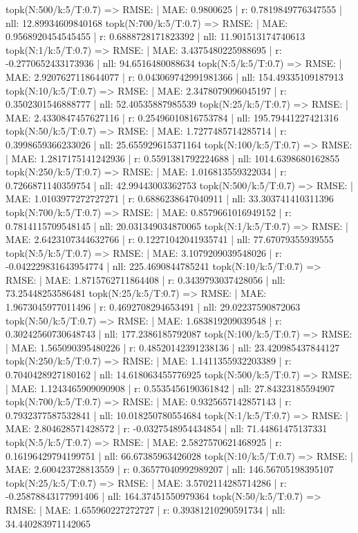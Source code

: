 topk(N:500/k:5/T:0.7) => RMSE: | MAE: 0.9800625 | r: 0.7819849776347555 | nll: 12.89934609840168
topk(N:700/k:5/T:0.7) => RMSE: | MAE: 0.9568920454545455 | r: 0.6888728171823392 | nll: 11.901513174740613
topk(N:1/k:5/T:0.7) => RMSE: | MAE: 3.4375480225988695 | r: -0.2770652433173936 | nll: 94.6516480088634
topk(N:5/k:5/T:0.7) => RMSE: | MAE: 2.9207627118644077 | r: 0.043069742991981366 | nll: 154.49335109187913
topk(N:10/k:5/T:0.7) => RMSE: | MAE: 2.3478079096045197 | r: 0.3502301546888777 | nll: 52.40535887985539
topk(N:25/k:5/T:0.7) => RMSE: | MAE: 2.4330847457627116 | r: 0.25496010816753784 | nll: 195.79441227421316
topk(N:50/k:5/T:0.7) => RMSE: | MAE: 1.7277485714285714 | r: 0.3998659366233026 | nll: 25.655929615371164
topk(N:100/k:5/T:0.7) => RMSE: | MAE: 1.2817175141242936 | r: 0.5591381792224688 | nll: 1014.6398680162855
topk(N:250/k:5/T:0.7) => RMSE: | MAE: 1.016813559322034 | r: 0.7266871140359754 | nll: 42.99443003362753
topk(N:500/k:5/T:0.7) => RMSE: | MAE: 1.0103977272727271 | r: 0.6886238647040911 | nll: 33.303741410311396
topk(N:700/k:5/T:0.7) => RMSE: | MAE: 0.8579661016949152 | r: 0.7814115709548145 | nll: 20.031349034870065
topk(N:1/k:5/T:0.7) => RMSE: | MAE: 2.6423107344632766 | r: 0.12271042041935741 | nll: 77.67079355939555
topk(N:5/k:5/T:0.7) => RMSE: | MAE: 3.1079209039548026 | r: -0.042229831643954774 | nll: 225.4690844785241
topk(N:10/k:5/T:0.7) => RMSE: | MAE: 1.8715762711864408 | r: 0.3439793037428056 | nll: 73.25448253586481
topk(N:25/k:5/T:0.7) => RMSE: | MAE: 1.9673045977011496 | r: 0.4692708294653491 | nll: 29.02237590872063
topk(N:50/k:5/T:0.7) => RMSE: | MAE: 1.683819209039548 | r: 0.30242560730648743 | nll: 177.2386185792087
topk(N:100/k:5/T:0.7) => RMSE: | MAE: 1.565090395480226 | r: 0.48520142391238136 | nll: 23.420985437844127
topk(N:250/k:5/T:0.7) => RMSE: | MAE: 1.1411355932203389 | r: 0.7040428927180162 | nll: 14.618063455776925
topk(N:500/k:5/T:0.7) => RMSE: | MAE: 1.1243465909090908 | r: 0.5535456190361842 | nll: 27.84323185594907
topk(N:700/k:5/T:0.7) => RMSE: | MAE: 0.9325657142857143 | r: 0.7932377587532841 | nll: 10.018250780554684
topk(N:1/k:5/T:0.7) => RMSE: | MAE: 2.804628571428572 | r: -0.0327548954434854 | nll: 71.44861475137331
topk(N:5/k:5/T:0.7) => RMSE: | MAE: 2.5827570621468925 | r: 0.16196429794199751 | nll: 66.67385963426028
topk(N:10/k:5/T:0.7) => RMSE: | MAE: 2.600423728813559 | r: 0.36577040992989207 | nll: 146.56705198395107
topk(N:25/k:5/T:0.7) => RMSE: | MAE: 3.5702114285714286 | r: -0.25878843177991406 | nll: 164.37451550979364
topk(N:50/k:5/T:0.7) => RMSE: | MAE: 1.655960227272727 | r: 0.39381210290591734 | nll: 34.440283971142065
